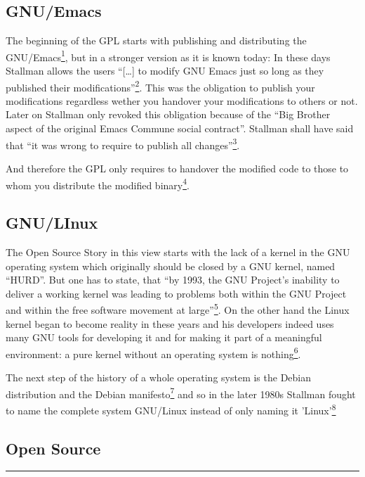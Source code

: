 \documentclass[DIV=calc,BCOR=5mm,11pt,headings=small,oneside,abstract=true, toc=bib]{scrartcl}
\begin{document}
\subsection{GNU/Emacs}

The beginning of the GPL starts with publishing and distributing the
GNU/Emacs\footcite[cf][123]{Williams2002a}, but in a stronger version as it is
known today: In these days Stallman allows the users \enquote{[\ldots] to
modify GNU Emacs just so long as they published their
modifications}\footcite[cf][124]{Williams2002a}. This was the obligation
to publish your modifications regardless wether you handover your modifications
to others or not. Later on Stallman only revoked this obligation because of the
\enquote{Big Brother aspect of the original Emacs Commune social contract}.
Stallman shall have said that \enquote{it was wrong to require to publish all
changes}\footcite[cf][127]{Williams2002a}.

And therefore the GPL only requires to handover the modified code to those  to
whom you distribute the modified  binary\footcite[cf][128ff]{Williams2002a}.

\subsection{GNU/LInux}

The Open Source Story in this view starts with the lack of a kernel in the GNU
operating system which originally should be closed by a GNU kernel, named
\enquote{HURD}. But one has to state, that \enquote{by 1993, the GNU Project's
inability to deliver a working kernel was leading to problems both within the
GNU Project and within the free software movement at
large}\footcite[cf][145]{Williams2002a}. On the other hand the Linux
kernel began to become reality in these years
and his developers indeed uses many GNU
tools for developing it and for making it part of
a meaningful environment: a pure kernel without an
operating system is nothing\footcite[cf][143]{Williams2002a}.

The next step of the history of a whole operating system is the Debian
distribution and the Debian manifesto\footcite[cf][147]{Williams2002a} and so in
the later 1980s Stallman fought to name the complete system GNU/Linux instead of
only naming it 'Linux'\footcite[cf][149f]{Williams2002a}

\subsection{Open Source}
\end{document}
